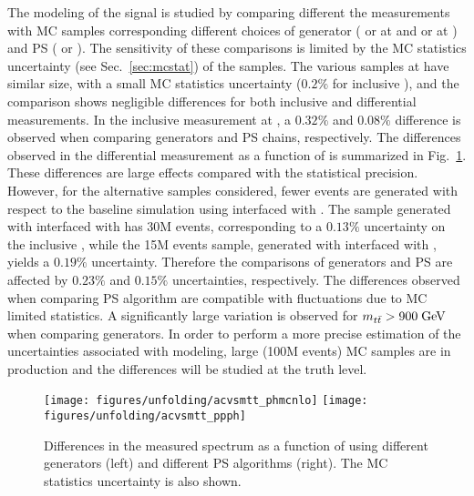 The modeling of the \ttbar{} signal is studied by comparing different the
measurements with MC samples corresponding different choices of generator
(\alpgen{} or \mcatnlo{} at \seventev{} and \powheg{} or \mcatnlo{} at
\eighttev{}) and PS (\pythia{} or \herwig{}).
The sensitivity of these comparisons is limited by the MC statistics
uncertainty (see Sec.~\ref{sec:mcstat}) of the samples. 
The various \ttbar{} samples  at \seventev{} have similar size, with a
small MC statistics uncertainty ($0.2\%$ for inclusive
\ac{}), and the comparison shows negligible differences for both
inclusive and differential measurements. 
In the inclusive measurement at \eighttev{}, a $0.32\%$ and $0.08\%$
difference is observed when comparing generators and PS chains,
respectively. The differences observed in the differential measurement
as a function of \mtt{} is summarized in Fig.~\ref{fig:ttbarmodel}.
These differences are large effects compared with the statistical
precision. However, for the alternative \ttbar{} samples considered,
fewer events are generated with respect to the baseline simulation
using \powheg{} interfaced with \pythia{}. 
The sample generated with \powheg{} interfaced with \pythia{} has 30M
events, corresponding to a $0.13\%$ uncertainty on the inclusive
\ac{}, while the 15M events sample, generated with \mcatnlo{}
interfaced with \herwig{}, yields a $0.19\%$ uncertainty. Therefore
the comparisons of generators and PS are affected by $0.23\%$ and
$0.15\%$ uncertainties, respectively. The differences observed when
comparing PS algorithm are compatible with fluctuations due to MC limited
statistics. A significantly large variation is observed for
$m_{t\bar{t}}{}>900\; \mathrm{GeV}{}$ when comparing generators.
In order to perform a more precise estimation of the uncertainties
associated with \ttbar{} modeling, large (100M events) MC samples are
in production and the differences will be studied at the truth level.

\begin{figure}[!htb]\centering
  \texttt{[image: figures/unfolding/acvsmtt\_phmcnlo]}
  \texttt{[image: figures/unfolding/acvsmtt\_ppph]}
  \caption{Differences in the measured \ac{} spectrum as a function of
    \mtt{} using different generators (left) and different PS
    algorithms (right). The MC statistics uncertainty is also
    shown.}
  \label{fig:ttbarmodel}
\end{figure}
